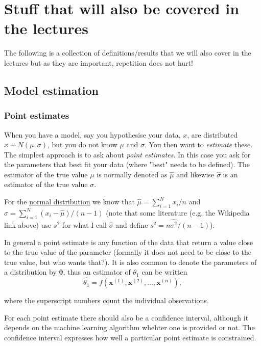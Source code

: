 \documentclass[a4paper,10pt]{article}
\begin{document}
\section{ Stuff that will also be covered in the lectures}

The following is a collection of definitions/results that we will also cover in the lectures but as they are important, repetition does not hurt!

\subsection{ Model estimation}


\subsubsection{ Point estimates}

When you have a model, say you hypothesise your data, $x$, are distributed $x\sim N(\mu, \sigma)$, but you do not know $\mu$ and $\sigma$. You then want to \textit{estimate} these. The simplest approach is to ask about \textit{point estimates}. In this case you ask for the parameters that best fit your data (where "best" needs to be defined). The estimator of the true value $\mu$ is normally denoted as $\hat{\mu}$ and likewise $\hat{\sigma}$ is an estimator of the true value $\sigma$.

For the \href{https://en.wikipedia.org/wiki/Normal_distribution}{normal distribution} we know that $\hat{\mu}=\sum_{i=1}^N x_i/n$ and $\hat{\sigma} = \sum_{i=1}^N \left(x_i-\hat{\mu}\right)/(n-1)$ (note that some literature (e.g. the Wikipedia link above) use $s^2$ for what I call $\hat{\sigma}$ and define $s^2 = n \hat{\sigma^2}/(n-1)$).


In general a point estimate is any function of the data that return a value close to the true value of the parameter (formally it does not need to be close to the true value, but who wants that?). It is also common to denote the parameters of a distribution by $\boldsymbol{\theta}$, thus an estimator of $\theta_1$ can be written
$$\hat{\theta_1} = f(\mathbf{x}^{(1)}, \mathbf{x}^{(2)}, \ldots, \mathbf{x}^{(n)}),$$

where the superscript numbers count the individual observations.

For each point estimate there should also be a confidence interval, although it depends on the machine learning algorithm whehter one is provided or not. The confidence interval expresses how well a particular point estimate is constrained.
\end{document}
